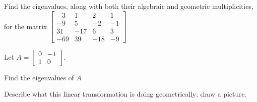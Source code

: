 \begin{applicationActivities}{4}{28}
\begin{activity}{15}
   Find the eigenvalues, along with both their algebraic and geometric multiplicities, for the matrix $\begin{bmatrix} -3 & 1 & 2 & 1 \\ -9 & 5 & -2 & -1 \\ 31 & -17 & 6 & 3 \\ -69 & 39 & -18 & -9 \end{bmatrix}$
\end{activity}

\begin{activity}{10}
Let  $A=\begin{bmatrix}0 & -1 \\ 1 & 0 \end{bmatrix}$.
\begin{subactivity}
  Find the eigenvalues of $A$
  \end{subactivity}
  \begin{subactivity}
   Describe what this linear transformation is doing geometrically; draw a picture.
   \end{subactivity}
\end{activity}



\end{applicationActivities}
